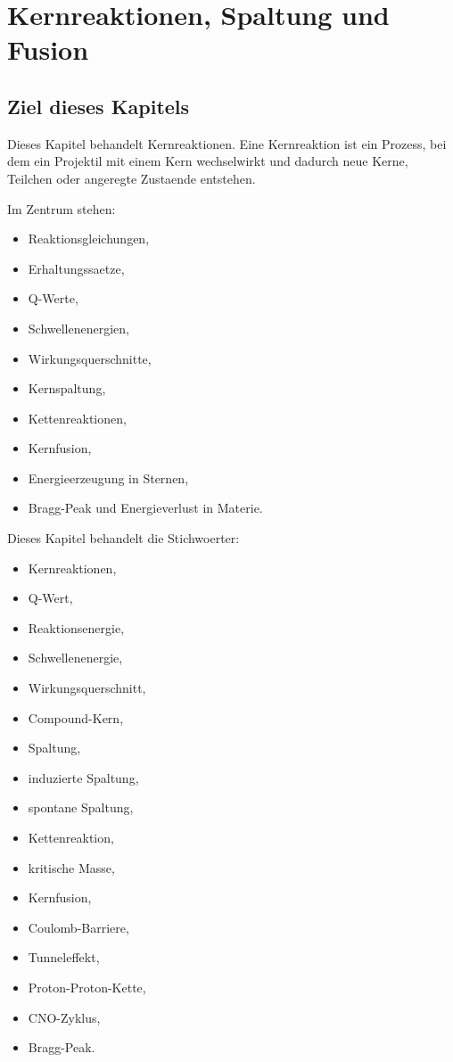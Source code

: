 \chapter{Kernreaktionen, Spaltung und Fusion}

\section{Ziel dieses Kapitels}

Dieses Kapitel behandelt Kernreaktionen.
Eine Kernreaktion ist ein Prozess, bei dem ein Projektil mit einem Kern wechselwirkt
und dadurch neue Kerne, Teilchen oder angeregte Zustaende entstehen.

Im Zentrum stehen:
\begin{itemize}
    \item Reaktionsgleichungen,
    \item Erhaltungssaetze,
    \item Q-Werte,
    \item Schwellenenergien,
    \item Wirkungsquerschnitte,
    \item Kernspaltung,
    \item Kettenreaktionen,
    \item Kernfusion,
    \item Energieerzeugung in Sternen,
    \item Bragg-Peak und Energieverlust in Materie.
\end{itemize}

\begin{notebox}
Dieses Kapitel behandelt die Stichwoerter:
\begin{itemize}
    \item Kernreaktionen,
    \item Q-Wert,
    \item Reaktionsenergie,
    \item Schwellenenergie,
    \item Wirkungsquerschnitt,
    \item Compound-Kern,
    \item Spaltung,
    \item induzierte Spaltung,
    \item spontane Spaltung,
    \item Kettenreaktion,
    \item kritische Masse,
    \item Kernfusion,
    \item Coulomb-Barriere,
    \item Tunneleffekt,
    \item Proton-Proton-Kette,
    \item CNO-Zyklus,
    \item Bragg-Peak.
\end{itemize}
\end{notebox}


